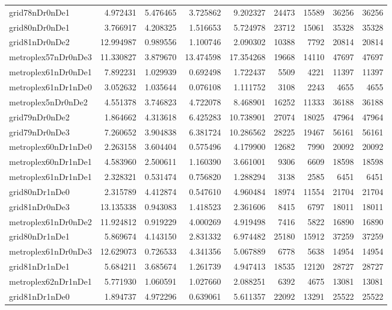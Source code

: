 \begin{longtable}{|l|r|r|r|r|r|r|r|r|}
grid78nDr0nDe1 & 4.972431 & 5.476465 & 3.725862 & 9.202327 & 24473 & 15589 & 36256 & 36256 \\
grid80nDr0nDe1 & 3.766917 & 4.208325 & 1.516653 & 5.724978 & 23712 & 15061 & 35328 & 35328 \\
grid81nDr0nDe2 & 12.994987 & 0.989556 & 1.100746 & 2.090302 & 10388 & 7792 & 20814 & 20814 \\
metroplex57nDr0nDe3 & 11.330827 & 3.879670 & 13.474598 & 17.354268 & 19668 & 14110 & 47697 & 47697 \\
metroplex61nDr0nDe1 & 7.892231 & 1.029939 & 0.692498 & 1.722437 & 5509 & 4221 & 11397 & 11397 \\
metroplex61nDr1nDe0 & 3.052632 & 1.035644 & 0.076108 & 1.111752 & 3108 & 2243 & 4655 & 4655 \\
metroplex5nDr0nDe2 & 4.551378 & 3.746823 & 4.722078 & 8.468901 & 16252 & 11333 & 36188 & 36188 \\
grid79nDr0nDe2 & 1.864662 & 4.313618 & 6.425283 & 10.738901 & 27074 & 18025 & 47964 & 47964 \\
grid79nDr0nDe3 & 7.260652 & 3.904838 & 6.381724 & 10.286562 & 28225 & 19467 & 56161 & 56161 \\
metroplex60nDr1nDe0 & 2.263158 & 3.604404 & 0.575496 & 4.179900 & 12682 & 7990 & 20092 & 20092 \\
metroplex60nDr1nDe1 & 4.583960 & 2.500611 & 1.160390 & 3.661001 & 9306 & 6609 & 18598 & 18598 \\
metroplex61nDr1nDe1 & 2.328321 & 0.531474 & 0.756820 & 1.288294 & 3138 & 2585 & 6451 & 6451 \\
grid80nDr1nDe0 & 2.315789 & 4.412874 & 0.547610 & 4.960484 & 18974 & 11554 & 21704 & 21704 \\
grid81nDr0nDe3 & 13.135338 & 0.943083 & 1.418523 & 2.361606 & 8415 & 6797 & 18011 & 18011 \\
metroplex61nDr0nDe2 & 11.924812 & 0.919229 & 4.000269 & 4.919498 & 7416 & 5822 & 16890 & 16890 \\
grid80nDr1nDe1 & 5.869674 & 4.143150 & 2.831332 & 6.974482 & 25180 & 15912 & 37259 & 37259 \\
metroplex61nDr0nDe3 & 12.629073 & 0.726533 & 4.341356 & 5.067889 & 6778 & 5638 & 14954 & 14954 \\
grid81nDr1nDe1 & 5.684211 & 3.685674 & 1.261739 & 4.947413 & 18535 & 12120 & 28727 & 28727 \\
metroplex62nDr1nDe1 & 5.771930 & 1.060591 & 1.027660 & 2.088251 & 6392 & 4675 & 13081 & 13081 \\
grid81nDr1nDe0 & 1.894737 & 4.972296 & 0.639061 & 5.611357 & 22092 & 13291 & 25522 & 25522 \\

\end{longtable}
